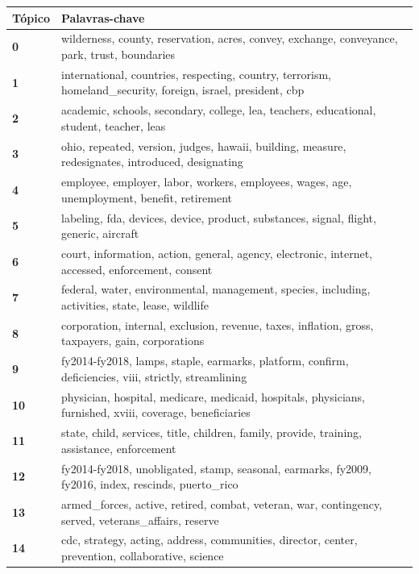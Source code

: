 \begin{table}[htpb]
    \centering
    \scriptsize
    \begin{tabularx}{\textwidth}{@{}l X@{}}
        \toprule
        \textbf{Tópico} & \textbf{Palavras-chave} \\
        \midrule
        \textbf{0} & wilderness, county, reservation, acres, convey, exchange, conveyance, park, trust, boundaries \\
        \textbf{1} & international, countries, respecting, country, terrorism, homeland\_security, foreign, israel, president, cbp \\
        \textbf{2} & academic, schools, secondary, college, lea, teachers, educational, student, teacher, leas \\
        \textbf{3} & ohio, repeated, version, judges, hawaii, building, measure, redesignates, introduced, designating \\
        \textbf{4} & employee, employer, labor, workers, employees, wages, age, unemployment, benefit, retirement \\
        \textbf{5} & labeling, fda, devices, device, product, substances, signal, flight, generic, aircraft \\
        \textbf{6} & court, information, action, general, agency, electronic, internet, accessed, enforcement, consent \\
        \textbf{7} & federal, water, environmental, management, species, including, activities, state, lease, wildlife \\
        \textbf{8} & corporation, internal, exclusion, revenue, taxes, inflation, gross, taxpayers, gain, corporations \\
        \textbf{9} & fy2014-fy2018, lamps, staple, earmarks, platform, confirm, deficiencies, viii, strictly, streamlining \\
        \textbf{10} & physician, hospital, medicare, medicaid, hospitals, physicians, furnished, xviii, coverage, beneficiaries \\
        \textbf{11} & state, child, services, title, children, family, provide, training, assistance, enforcement \\
        \textbf{12} & fy2014-fy2018, unobligated, stamp, seasonal, earmarks, fy2009, fy2016, index, rescinds, puerto\_rico \\
        \textbf{13} & armed\_forces, active, retired, combat, veteran, war, contingency, served, veterans\_affairs, reserve \\
        \textbf{14} & cdc, strategy, acting, address, communities, director, center, prevention, collaborative, science \\

\end{tabularx}
\end{table}
